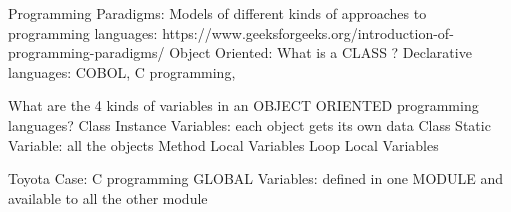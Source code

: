 Programming Paradigms: Models of different kinds of approaches to programming languages:
https://www.geeksforgeeks.org/introduction-of-programming-paradigms/ 
Object Oriented: What is a CLASS ?
Declarative languages: COBOL,  C programming,

What are the 4 kinds of variables in an OBJECT ORIENTED programming languages?
Class Instance Variables: each object gets its own data
Class Static Variable: all the objects
Method Local Variables
Loop Local Variables

Toyota Case: C programming
GLOBAL Variables: defined in one MODULE and available to all the other module
